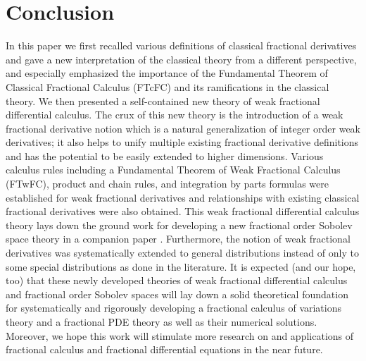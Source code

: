 \documentclass[leqno,final]{siamltex}
\numberwithin{equation}{section}
\renewcommand{\(}{\bigl(}
\renewcommand{\)}{\bigr)}
\begin{document}
\section{Conclusion}\label{sec-7}
 In this paper we first recalled various definitions of classical fractional 
  	derivatives and gave a new interpretation of the classical theory from a different 
   perspective, and especially emphasized the importance of the Fundamental 
   Theorem of Classical  Fractional Calculus (FTcFC) and its ramifications in the classical theory. 
   We then presented a self-contained new theory of weak fractional differential 
   calculus. The crux of this new theory 
   is the introduction of a weak fractional derivative notion which is a natural 
   generalization of integer order weak derivatives; it also helps to unify multiple existing 
   fractional derivative definitions and has the potential to be easily extended to higher dimensions.  Various calculus rules including a Fundamental Theorem of Weak 
   Fractional Calculus (FTwFC), product and chain rules,
   and integration by parts formulas were established for weak fractional derivatives 
   and relationships with existing classical 
   fractional derivatives were also obtained.   This weak fractional differential calculus 
   theory lays down the ground work for developing a new fractional order Sobolev space theory   in a companion paper \cite{Feng_Sutton1a}. 
   Furthermore, the notion of weak fractional derivatives was systematically extended 
   to general distributions instead of only to some special distributions as done in the literature. 
   It is expected (and our hope, too) that these newly developed theories of weak fractional 
   differential calculus and fractional order Sobolev spaces will lay down a solid theoretical  
   foundation for systematically and rigorously developing a fractional calculus of variations 
   theory and a fractional PDE theory as well as their numerical solutions. Moreover, we hope this work  will stimulate more research on and applications of fractional calculus and 
   fractional differential equations in the near future.
\end{document}
